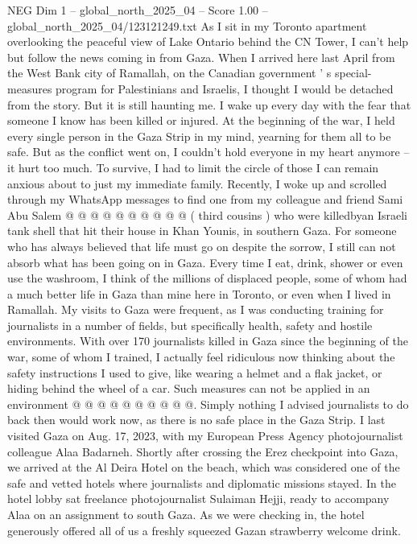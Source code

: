 \begin{textsample}{NEG Dim 1 – global\_north\_2025\_04 – Score 1.00 – global\_north\_2025\_04/123121249.txt}  \label{ex:f1_neg_043}
As I sit in my Toronto apartment overlooking the peaceful view of Lake Ontario behind the CN Tower, I can't help but follow the news coming in from Gaza.
When I arrived here last April from the West Bank city of Ramallah, on the Canadian government ' s special-measures program for Palestinians and Israelis, I thought I would be detached from the story.
But it is still haunting me.
I wake up every day with the fear that someone I know has been killed or injured.
At the beginning of the war, I held every single person in the Gaza Strip in my mind, yearning for them all to be safe.
But as the conflict went on, I couldn't hold everyone in my heart anymore -- it hurt too much.
To survive, I had to limit the circle of those I can remain anxious about to just my immediate family.
Recently, I woke up and scrolled through my WhatsApp messages to find one from my colleague and friend Sami Abu Salem @ @ @ @ @ @ @ @ @ @ ( third cousins ) who were killedbyan Israeli tank shell that hit their house in Khan Younis, in southern Gaza.
For someone who has always believed that life must go on despite the sorrow, I still can not absorb what has been going on in Gaza.
Every time I eat, drink, shower or even use the washroom, I think of the millions of displaced people, some of whom had a much better life in Gaza than mine here in Toronto, or even when I lived in Ramallah.
My visits to Gaza were frequent, as I was conducting training for journalists in a number of fields, but specifically health, safety and hostile environments.
With over 170 journalists killed in Gaza since the beginning of the war, some of whom I trained, I actually feel ridiculous now thinking about the safety instructions I used to give, like wearing a helmet and a flak jacket, or hiding behind the wheel of a car.
Such measures can not be applied in an environment @ @ @ @ @ @ @ @ @ @.
Simply nothing I advised journalists to do back then would work now, as there is no safe place in the Gaza Strip.
I last visited Gaza on Aug. 17, 2023, with my European Press Agency photojournalist colleague Alaa Badarneh.
Shortly after crossing the Erez checkpoint into Gaza, we arrived at the Al Deira Hotel on the beach, which was considered one of the safe and vetted hotels where journalists and diplomatic missions stayed.
In the hotel lobby sat freelance photojournalist Sulaiman Hejji, ready to accompany Alaa on an assignment to south Gaza.
As we were checking in, the hotel generously offered all of us a freshly squeezed Gazan strawberry welcome drink.

\end{textsample}
